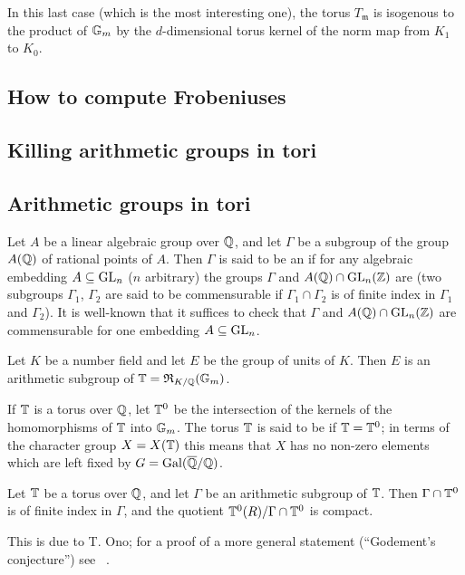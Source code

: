 \begin{obs}
In this last case (which is the most interesting one), the torus
$T_{\mathfrak{m}}$ is isogenous to the product of $\mathbb{G}_m$ by the
$d$-dimensional torus kernel of the norm map from $K_1$ to $K_0$.
\end{obs}

\subsection{How to compute Frobeniuses}

\begin{subappendices}
\section{Killing arithmetic groups in tori}

\subsection{Arithmetic groups in tori}
Let $A$ be a linear algebraic group over $\mathbb{Q}$, and let $\Gamma$ be a subgroup
of the group $A(\mathbb{Q})$ of rational points of $A$. Then $\Gamma$ is said to be an
 if for any algebraic
embedding
\dpage
$A \subseteq \operatorname{GL}_n$ ($n$ arbitrary) the groups $\Gamma$ and $A(\mathbb{Q}) \cap
\operatorname{GL}_n(\mathbb{Z})$ are  (two
subgroups $\Gamma_1$, $\Gamma_2$ are said to be commensurable if $\Gamma_1 \cap
\Gamma_2$ is of finite index in $\Gamma_1$ and $\Gamma_2$). It is well-known
that it suffices to check that $\Gamma$ and $A(\mathbb{Q}) \cap \operatorname{GL}_n(\mathbb{Z})$ are
commensurable for one embedding $A \subseteq \operatorname{GL}_n$.

\begin{ex}
Let $K$ be a number field and let $E$ be the group of units of $K$.
Then $E$ is an arithmetic subgroup of $\mathbb{T} = \operatorname{\mathfrak{R}}_{K/\mathbb{Q}}(\mathbb{G}_m)$.
\end{ex}
If $\mathbb{T}$ is a torus over $\mathbb{Q}$, let $\mathbb{T}^0$ be the intersection of the kernels
of the homomorphisms of $\mathbb{T}$ into $\mathbb{G}_m$. The torus $\mathbb{T}$ is said to be
 if $\mathbb{T} = \mathbb{T}^0$; in terms of
the character group $X = X(\mathbb{T})$ this means that $X$ has no non-zero elements
which are left fixed by $G = \operatorname{Gal}(\overline{\mathbb{Q}}/\mathbb{Q})$.

\begin{thm}
Let $\mathbb{T}$ be a torus over $\mathbb{Q}$, and let $\Gamma$ be an arithmetic subgroup of
$\mathbb{T}$. Then $\Gamma \cap \mathbb{T}^0$ is of finite index in $\Gamma$, and the
quotient $\mathbb{T}^0(R)/\Gamma \cap \mathbb{T}^0$ is compact.
\end{thm}
This is due to T. Ono; for a proof of a more general statement (``Godement's
conjecture'') see \citeauthor{18}~\cite{18}.


\end{subappendices}
